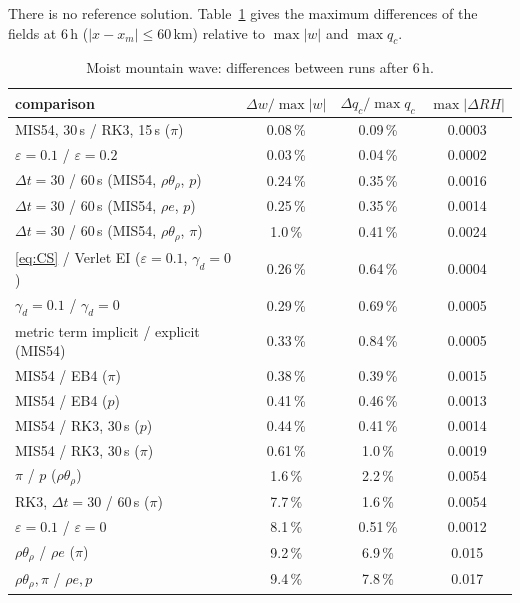 \documentclass[11pt,a4paper]{article}
\newcommand{\dt}{\Delta t}
\begin{document}
There is no reference solution. Table~\ref{tab:hilldiff} gives the maximum differences of the fields at
6\,h ($|x-x_m|\le60$\,km) relative to $\max|w|$ and $\max q_c$.
\begin{table}[htbp]\centering\small
\caption{Moist mountain wave: differences between runs after 6\,h.}\label{tab:hilldiff}
\begin{tabular}{lccc}\toprule
comparison & $\Delta w/\max|w|$ & $\Delta q_c/\max q_c$ & $\max|\Delta RH|$\\\midrule
MIS54, 30\,s / RK3, 15\,s ($\pi$) & 0.08\,\% & 0.09\,\% & 0.0003\\
$\varepsilon=0.1$ / $\varepsilon=0.2$ & 0.03\,\% & 0.04\,\% & 0.0002\\
$\dt=30$ / 60\,s (MIS54, $\rho\theta_\rho$, $p$) & 0.24\,\% & 0.35\,\% & 0.0016\\
$\dt=30$ / 60\,s (MIS54, $\rho e$, $p$) & 0.25\,\% & 0.35\,\% & 0.0014\\
$\dt=30$ / 60\,s (MIS54, $\rho\theta_\rho$, $\pi$) & 1.0\,\% & 0.41\,\% & 0.0024\\
\eqref{eq:CS} / Verlet EI ($\varepsilon=0.1$, $\gamma_d=0$) & 0.26\,\% & 0.64\,\% & 0.0004\\
$\gamma_d=0.1$ / $\gamma_d=0$ & 0.29\,\% & 0.69\,\% & 0.0005\\
metric term implicit / explicit (MIS54) & 0.33\,\% & 0.84\,\% & 0.0005\\
MIS54 / EB4 ($\pi$) & 0.38\,\% & 0.39\,\% & 0.0015\\
MIS54 / EB4 ($p$) & 0.41\,\% & 0.46\,\% & 0.0013\\
MIS54 / RK3, 30\,s ($p$) & 0.44\,\% & 0.41\,\% & 0.0014\\
MIS54 / RK3, 30\,s ($\pi$) & 0.61\,\% & 1.0\,\% & 0.0019\\
$\pi$ / $p$ ($\rho\theta_\rho$) & 1.6\,\% & 2.2\,\% & 0.0054\\
RK3, $\dt=30$ / 60\,s ($\pi$) & 7.7\,\% & 1.6\,\% & 0.0054\\
$\varepsilon=0.1$ / $\varepsilon=0$ & 8.1\,\% & 0.51\,\% & 0.0012\\
$\rho\theta_\rho$ / $\rho e$ ($\pi$) & 9.2\,\% & 6.9\,\% & 0.015\\
$\rho\theta_\rho,\pi$ / $\rho e,p$ & 9.4\,\% & 7.8\,\% & 0.017\\\bottomrule
\end{tabular}
\end{table}
\end{document}
